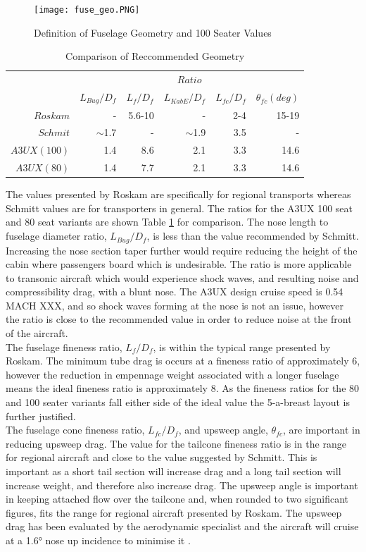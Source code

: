 \documentclass[11pt]{article}
\newcommand{\ra}[1]{\renewcommand{\arraystretch}{#1}}
\begin{document}
\begin{figure}[h!]
\centering
\texttt{[image: fuse\_geo.PNG]}
\caption{Definition of Fuselage Geometry and 100 Seater Values}
\label{fig:fgeo}
\end{figure}


\begin{table}[!h]
\centering
\ra{1.3}
\begin{tabular}{@{}rrrrrr@{}}\toprule
& \multicolumn{5}{c}{$Ratio$}\\
\cmidrule{2-6}
&$L_{Bug} / D_f$&$L_f / D_f $&$L_{KabE} / D_f$&$L_{fc} / D_f$&$\theta_{fc} (deg)$\\ \midrule
$Roskam$& - &5.6-10& - &2-4&15-19 \\
$Schmit$&$\sim$1.7&-&$\sim$1.9 &3.5&- \\ \midrule
$A3UX (100)$&1.4&8.6&2.1&3.3&14.6 \\
$A3UX (80)$&1.4&7.7&2.1&3.3&14.6 \\
\bottomrule
\end{tabular}
\caption{Comparison of Reccommended Geometry}
\label{table:fgeo}
\end{table}


The values presented by Roskam are specifically for regional transports whereas Schmitt values are for transporters in general. The ratios for the A3UX 100 seat and 80 seat variants are shown Table \ref{table:fgeo} for comparison. The nose length to fuselage diameter ratio, $L_{Bug} / D_f$, is less than the value recommended by Schmitt. Increasing the nose section taper further would require reducing the height of the cabin where passengers board which is undesirable. The ratio is more applicable to transonic aircraft which would experience shock waves, and resulting noise and compressibility drag, with a blunt nose. The A3UX design cruise speed is 0.54 MACH XXX, and so shock waves forming at the nose is not an issue, however the ratio is close to the recommended value in order to reduce noise at the front of the aircraft. \\
The fuselage fineness ratio, $ L_f / D_f$, is within the typical range presented by Roskam. The minimum tube drag is occurs at a fineness ratio of approximately 6, however the reduction in empennage weight associated with a longer fuselage means the ideal fineness ratio is approximately 8. As the fineness ratios for the 80 and 100 seater variants fall either side of the ideal value the 5-a-breast layout is further justified. \\
The fuselage cone fineness ratio, $L_{fc} / D_f$, and upsweep angle, $\theta_{fc}$, are important in reducing upsweep drag. The value for the tailcone fineness ratio is in the range for regional aircraft and close to the value suggested by Schmitt. This is important as a short tail section will increase drag and a long tail section will increase weight, and therefore also increase drag. The upsweep angle is important in keeping attached flow over the tailcone and, when rounded to two significant figures, fits the range for regional aircraft presented by Roskam. The upsweep drag has been evaluated by the aerodynamic specialist and the aircraft will cruise at a \ang{1.6} nose up incidence to minimise it \cite{kit}. 
\end{document}
